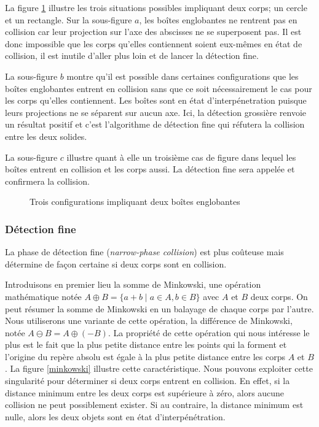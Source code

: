 La figure \ref{aabb} illustre les trois situations possibles
impliquant deux corps; un cercle et un rectangle. Sur la sous-figure
$a$, les boîtes englobantes ne rentrent pas en collision car leur
projection sur l'axe des abscisses ne se superposent pas. Il est donc
impossible que les corps qu'elles contiennent soient eux-mêmes en état
de collision, il est inutile d'aller plus loin et de lancer la
détection fine.

La sous-figure $b$ montre qu'il est possible dans certaines
configurations que les boîtes englobantes entrent en collision sans
que ce soit nécessairement le cas pour les corps qu'elles
contiennent. Les boîtes sont en état d'interpénetration puisque leurs
projections ne se séparent sur aucun axe. Ici, la détection grossière
renvoie un résultat positif et c'est l'algorithme de détection fine
qui réfutera la collision entre les deux solides.

La sous-figure $c$ illustre quant à elle un troisième cas de figure
dans lequel les boîtes entrent en collision et les corps aussi. La
détection fine sera appelée et confirmera la collision.

\begin{figure}
  \centering
  \subfloat[]{  }
  \qquad
  \subfloat[]{  }
  \qquad
  \subfloat[]{  }
  \caption{Trois configurations impliquant deux boîtes englobantes}
  \label{aabb}
\end{figure}

\subsubsection{Détection fine}

La phase de détection fine (\textit{narrow-phase collision}) est plus
coûteuse mais détermine de façon certaine si deux corps sont en
collision.

Introduisons en premier lieu la somme de Minkowski, une opération
mathématique notée $A \oplus B = \{a + b \mid a \in A, b \in B\}$ avec
$A$ et $B$ deux corps. On peut résumer la somme de Minkowski en un
balayage de chaque corps par l'autre. Nous utiliserons une variante de
cette opération, la différence de Minkowski, notée $A \ominus B = A
\oplus (-B)$. La propriété de cette opération qui nous intéresse le
plus est le fait que la plus petite distance entre les points qui la
forment et l'origine du repère absolu est égale à la plus petite
distance entre les corps $A$ et $B$. La figure \ref{minkowski}
illustre cette caractéristique. Nous pouvons exploiter cette
singularité pour déterminer si deux corps entrent en collision. En
effet, si la distance minimum entre les deux corps est supérieure à
zéro, alors aucune collision ne peut possiblement exister. Si au
contraire, la distance minimum est nulle, alors les deux objets sont
en état d'interpénétration.

